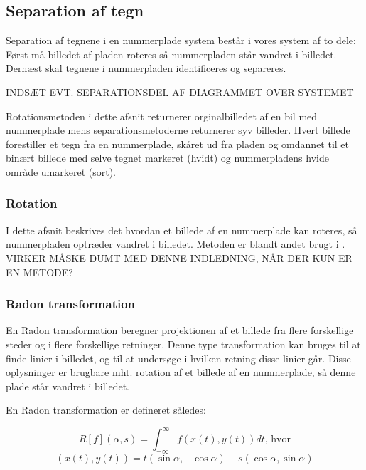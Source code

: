 \subsection{Separation af tegn}

Separation af tegnene i en nummerplade system består i vores system af to dele: Først må billedet af pladen roteres så nummerpladen står vandret i billedet. Dernæst skal tegnene i nummerpladen identificeres og separeres.

INDSÆT EVT. SEPARATIONSDEL AF DIAGRAMMET OVER SYSTEMET

Rotationsmetoden i dette afsnit returnerer orginalbilledet af en bil med nummerplade mens separationsmetoderne returnerer syv billeder. Hvert billede forestiller et tegn fra en nummerplade, skåret ud fra pladen og omdannet til et binært billede med selve tegnet markeret (hvidt) og nummerpladens hvide område umarkeret (sort).

\subsubsection{Rotation}

I dette afsnit beskrives det hvordan et billede af en nummerplade kan roteres, så nummerpladen optræder vandret i billedet. Metoden er blandt andet brugt i \cite{shapiro}. VIRKER MÅSKE DUMT MED DENNE INDLEDNING, NÅR DER KUN ER EN METODE?


\subsubsection*{Radon transformation}
En Radon transformation beregner projektionen af et billede fra flere forskellige steder og i flere forskellige retninger\cite{matlab_radon}. Denne type transformation kan bruges til at finde linier i billedet, og til at undersøge i hvilken retning disse linier går. Disse oplysninger er brugbare mht. rotation af et billede af en nummerplade, så denne plade står vandret i billedet.

En Radon transformation er defineret således\cite{wiki_radon}:

\begin{displaymath}
		R[f](\alpha,s) = \int_{-\infty}^{\infty}f(x(t),y(t))dt \text{, hvor}
\end{displaymath}
\begin{displaymath}
		(x(t),y(t)) = t(\sin\alpha, -\cos\alpha)+s(\cos\alpha,\sin\alpha)
\end{displaymath}

